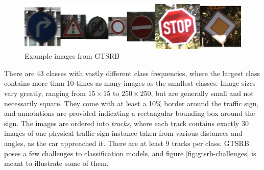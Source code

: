 \documentclass[11pt, a4paper]{article}
\begin{document}
\begin{figure}[h!tb]
	\centering
	\includegraphics[width=\textwidth]{images/gtsrb/overview.png}
	\caption{Example images from GTSRB}
	\label{fig:gtsrb-overview}
\end{figure}

There are 43 classes with vastly different class frequencies, where the largest class contains more than 10 times as many images as the smallest classes. Image sizes vary greatly, ranging from $15 \times 15$ to $250\times 250$, but are generally small and not necessarily square. They come with at least a 10\% border around the traffic sign, and annotations are provided indicating a rectangular bounding box around the sign. The images are ordered into \emph{tracks}, where each track contains exactly 30 images of one physical traffic sign instance taken from various distances and angles, as the car approached it. There are at least 9 tracks per class. GTSRB poses a few challenges to classification models, and figure \ref{fig:gtsrb-challenges} is meant to illustrate some of them.
\end{document}
